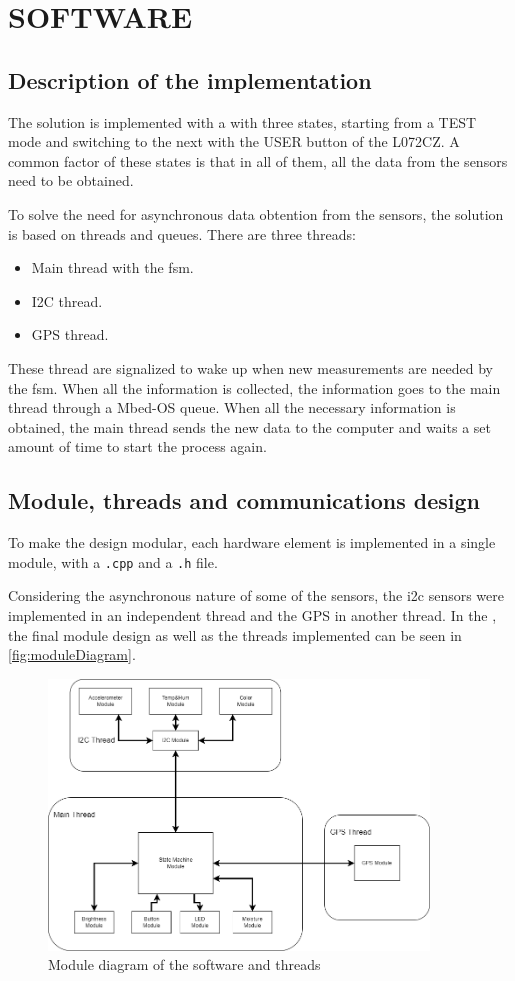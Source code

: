 \section{SOFTWARE}

\subsection{Description of the implementation}
The solution is implemented with a  with three states, starting from a TEST mode and switching to the next with the USER button of the L072CZ. A common factor of these states is that in all of them, all the data from the sensors need to be obtained.

To solve the need for asynchronous data obtention from the sensors, the solution is based on threads and queues. There are three threads:
\begin{itemize}
    \item Main thread with the \acrshort{fsm}.
    \item I2C thread.
    \item GPS thread.
\end{itemize}

These thread are signalized to wake up when new measurements are needed by the \acrshort{fsm}. When all the information is collected, the information goes to the main thread through a Mbed-OS queue. When all the necessary 
information is obtained, the main thread sends the new data to the computer and waits a set amount of time to start the process again.
\subsection{Module, threads and communications design}
To make the design modular, each hardware element is implemented in a single module, with a \texttt{.cpp} and a \texttt{.h} file.

Considering the asynchronous nature of some of the sensors, the i2c sensors were implemented in an independent thread and the GPS in another thread. In the , the final module design as well as the threads implemented 
can be seen in \autoref{fig:moduleDiagram}.
\begin{figure}[H]
    \centering
    \includegraphics[width=0.9\textwidth]{images/4/softdiagram.png}
    \caption{Module diagram of the software and threads}
    \label{fig:moduleDiagram}
\end{figure}

